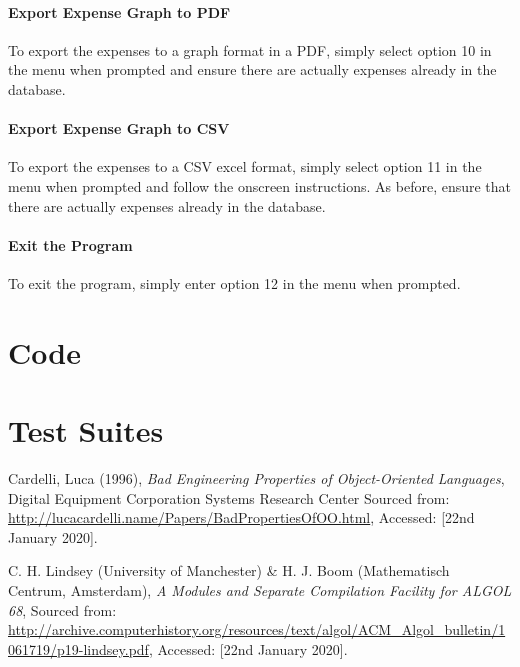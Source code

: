 \documentclass[12pt]{article}
\begin{document}
  \paragraph{Export Expense Graph to PDF}
  To export the expenses to a graph format in a PDF, simply select option 10 in the menu when prompted and ensure there are actually expenses already in the database.
  \paragraph{Export Expense Graph to CSV}
  To export the expenses to a CSV excel format, simply select option 11 in the menu when prompted and follow the onscreen instructions. As before, ensure that there are actually expenses already in the database.
  \paragraph{Exit the Program}
  To exit the program, simply enter option 12 in the menu when prompted.
  
  \section{Code}
  \section{Test Suites}

  \begin{thebibliography}{9}
    Cardelli, Luca (1996),
    \textit{Bad Engineering Properties of Object-Oriented Languages},
    Digital Equipment Corporation Systems Research Center
    Sourced from: \url{http://lucacardelli.name/Papers/BadPropertiesOfOO.html},
    Accessed: [22nd January 2020].

    C. H. Lindsey (University of Manchester) \&
    H. J. Boom (Mathematisch Centrum, Amsterdam),
    \textit{A Modules and Separate Compilation Facility for ALGOL 68},
    Sourced from: \url{http://archive.computerhistory.org/resources/text/algol/ACM_Algol_bulletin/1061719/p19-lindsey.pdf},
    Accessed: [22nd January 2020].


  \end{thebibliography}
\end{document}
